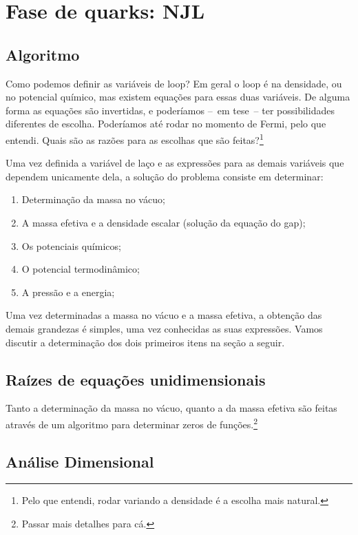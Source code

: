 \section{Fase de quarks: NJL}

\subsection{Algoritmo}

Como podemos definir as variáveis de loop? Em geral o loop é na densidade, ou no potencial químico, mas existem equações para essas duas variáveis. De alguma forma as equações são invertidas, e poderíamos --~em tese~-- ter possibilidades diferentes de escolha. Poderíamos até rodar no momento de Fermi, pelo que entendi. Quais são as razões para as escolhas que são feitas?\footnote{Pelo que entendi, rodar variando a densidade é a escolha mais natural.}

Uma vez definida a variável de laço e as expressões para as demais variáveis que dependem unicamente dela, a solução do problema consiste em determinar:
\begin{enumerate}
	\item Determinação da massa no vácuo;
	\item A massa efetiva e a densidade escalar (solução da equação do gap);
	\item Os potenciais químicos;
	\item O potencial termodinâmico;
	\item A pressão e a energia;
\end{enumerate}
%
Uma vez determinadas a massa no vácuo e a massa efetiva, a obtenção das demais grandezas é simples, uma vez conhecidas as suas expressões. Vamos discutir a determinação dos dois primeiros itens na seção a seguir. 

\subsection{Raízes de equações unidimensionais}

Tanto a determinação da massa no vácuo, quanto a da massa efetiva são feitas através de um algoritmo para determinar zeros de funções.\footnote{Passar mais detalhes para cá.}

\subsection{Análise Dimensional}

